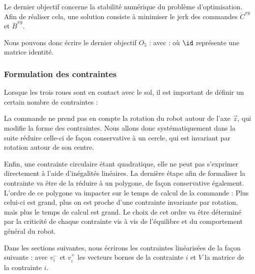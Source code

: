 					Le dernier objectif concerne la stabilité numérique du problème d'optimisation.
					Afin de réaliser cela, une solution consiste à minimiser le jerk des commandes $\dddot{C}^{xy}$ et $\dddot{B}^{xy}$.
					
					Nous pouvons donc écrire le dernier objectif $O_5$ :
					avec : 
					où $\id$ représente une matrice identité.

			\subsubsection{Formulation des contraintes}
			\label{ctr_intro_3_roues}

				Lorsque les trois roues sont en contact avec le sol, il est important de définir un certain nombre de contraintes :
				
				La commande ne prend pas en compte la rotation du robot autour de l'axe $\vec{z}$, qui modifie la forme des contraintes.
				Nous allons donc systématiquement dans la suite réduire celle-ci de façon conservative à un cercle, qui est invariant par rotation autour de son centre.
				
				Enfin, une contrainte circulaire étant quadratique, elle ne peut pas s'exprimer directement à l'aide d'inégalités linéaires.
				La dernière étape afin de formaliser la contrainte va être de la réduire à un polygone, de façon conservative également.
				L'ordre de ce polygone va impacter sur le temps de calcul de la commande : Plus celui-ci est grand, plus on est proche d'une contrainte invariante par rotation, mais plus le temps de calcul est grand.
				Le choix de cet ordre va être déterminé par la criticité de chaque contrainte vis à vis de l'équilibre et du comportement général du robot.
				
				
				Dans les sections suivantes, nous écrirons les contraintes linéarisées de la façon suivante :
				avec $v^-_i$ et $v^+_i$ les vecteurs bornes de la contrainte $i$ et $V$ la matrice de la contrainte $i$.
				

